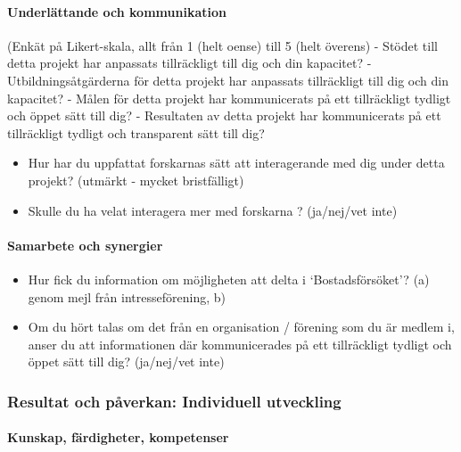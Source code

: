 \documentclass[]{tufte-handout}
\providecommand{\tightlist}{%
  \setlength{\itemsep}{0pt}\setlength{\parskip}{0pt}}
\begin{document}
\hypertarget{underluxe4ttande-och-kommunikation}{%
\paragraph{Underlättande och
kommunikation}\label{underluxe4ttande-och-kommunikation}}

(Enkät på Likert-skala, allt från 1 (helt oense) till 5 (helt överens) -
Stödet till detta projekt har anpassats tillräckligt till dig och din
kapacitet? - Utbildningsåtgärderna för detta projekt har anpassats
tillräckligt till dig och din kapacitet? - Målen för detta projekt har
kommunicerats på ett tillräckligt tydligt och öppet sätt till dig? -
Resultaten av detta projekt har kommunicerats på ett tillräckligt
tydligt och transparent sätt till dig?

\begin{itemize}
\tightlist
\item
  Hur har du uppfattat forskarnas sätt att interagerande med dig under
  detta projekt? (utmärkt - mycket bristfälligt)
\item
  Skulle du ha velat interagera mer med forskarna ? (ja/nej/vet inte)
\end{itemize}

\hypertarget{samarbete-och-synergier}{%
\paragraph{Samarbete och synergier}\label{samarbete-och-synergier}}

\begin{itemize}
\tightlist
\item
  Hur fick du information om möjligheten att delta i `Bostadsförsöket'?
  (a) genom mejl från intresseförening, b)
\item
  Om du hört talas om det från en organisation / förening som du är
  medlem i, anser du att informationen där kommunicerades på ett
  tillräckligt tydligt och öppet sätt till dig? (ja/nej/vet inte)
\end{itemize}

\hypertarget{resultat-och-puxe5verkan-individuell-utveckling}{%
\subsubsection{Resultat och påverkan: Individuell
utveckling}\label{resultat-och-puxe5verkan-individuell-utveckling}}

\hypertarget{kunskap-fuxe4rdigheter-kompetenser}{%
\paragraph{Kunskap, färdigheter,
kompetenser}\label{kunskap-fuxe4rdigheter-kompetenser}}
\end{document}

